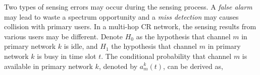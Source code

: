 \documentclass[12pt,onecolumn,draftclsnofoot]{IEEEtran} %
\begin{document}
Two types of sensing errors may occur during the sensing process. A {\em false alarm} may lead to waste a spectrum opportunity and a {\em miss detection} may causes collision with primary users. In a multi-hop CR network, the sensing results from various users may be different. Denote $H_0$ as the hypothesis that channel $m$ in primary network $k$ is idle, and $H_1$ the hypothesis that channel $m$ in primary network $k$ is busy in time slot $t$.  The conditional probability that channel $m$ is available in primary network $k$, denoted by $a_m^k(t)$, can be derived as,  
\end{document}
